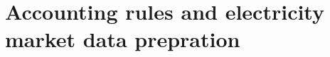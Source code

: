 \chapter{Accounting rules and electricity market data prepration}
\label{sec:accounting-data-prepare}

